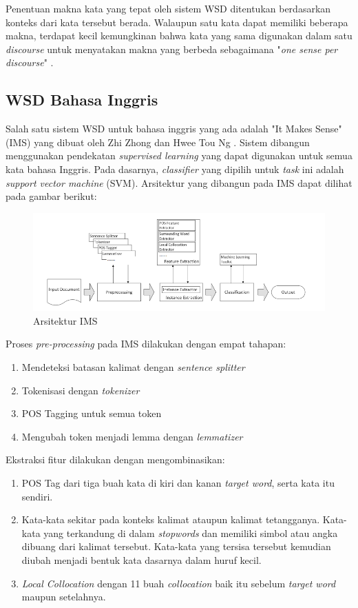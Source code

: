 Penentuan makna kata yang tepat oleh sistem WSD ditentukan berdasarkan konteks dari kata tersebut berada. Walaupun satu kata dapat memiliki beberapa makna, terdapat kecil kemungkinan bahwa kata yang sama digunakan dalam satu \textit{discourse} untuk menyatakan makna yang berbeda sebagaimana "\textit{one sense per discourse}" \citep{gale1992one}.

\subsection{WSD Bahasa Inggris}
Salah satu sistem WSD untuk bahasa inggris yang ada adalah "It Makes Sense" (IMS) yang dibuat oleh Zhi Zhong dan Hwee Tou Ng \citep{zhong2010makes}. Sistem  dibangun menggunakan pendekatan \textit{supervised learning} yang dapat digunakan untuk semua kata bahasa Inggris. Pada dasarnya, \textit{classifier} yang dipilih untuk \textit{task} ini adalah \textit{support vector machine} (SVM). Arsitektur yang dibangun pada IMS dapat dilihat pada gambar berikut:

\begin{figure}
	\centering
	\includegraphics[width=1\linewidth]{adit_pics/Arsitektur-IMS}
	\caption{Arsitektur IMS}
	\label{fig:Arsitektur-IMS}
\end{figure}

Proses \textit{pre-processing} pada IMS dilakukan dengan empat tahapan:
\begin{enumerate}
	\item Mendeteksi batasan kalimat dengan \textit{sentence splitter}
	\item Tokenisasi dengan \textit{tokenizer}
	\item POS Tagging untuk semua token
	\item Mengubah token menjadi lemma dengan \textit{lemmatizer}
\end{enumerate}

Ekstraksi fitur dilakukan dengan mengombinasikan:

\begin{enumerate}
	\item POS Tag dari tiga buah kata di kiri dan kanan \textit{target word}, serta kata itu sendiri. 
	\item Kata-kata sekitar pada konteks kalimat ataupun kalimat tetangganya. Kata-kata yang terkandung di dalam \textit{stopwords} dan memiliki simbol atau angka dibuang dari kalimat tersebut. Kata-kata yang tersisa tersebut kemudian diubah menjadi bentuk kata dasarnya dalam huruf kecil.
	\item \textit{Local Collocation} dengan 11 buah \textit{collocation} baik itu sebelum \textit{target word} maupun setelahnya. 
\end{enumerate}

